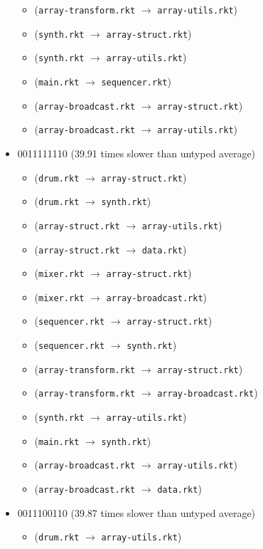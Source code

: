 \documentclass{article}
\newcommand{\mono}[1]{\texttt{#1}}
\begin{document}
\begin{itemize}
\begin{itemize}
  \item (\mono{array-transform.rkt} $\rightarrow$ \mono{array-utils.rkt})
  \item (\mono{synth.rkt} $\rightarrow$ \mono{array-struct.rkt})
  \item (\mono{synth.rkt} $\rightarrow$ \mono{array-utils.rkt})
  \item (\mono{main.rkt} $\rightarrow$ \mono{sequencer.rkt})
  \item (\mono{array-broadcast.rkt} $\rightarrow$ \mono{array-struct.rkt})
  \item (\mono{array-broadcast.rkt} $\rightarrow$ \mono{array-utils.rkt})
  \end{itemize}
\item 0011111110 (39.91 times slower than untyped average)
  \begin{itemize}
  \item (\mono{drum.rkt} $\rightarrow$ \mono{array-struct.rkt})
  \item (\mono{drum.rkt} $\rightarrow$ \mono{synth.rkt})
  \item (\mono{array-struct.rkt} $\rightarrow$ \mono{array-utils.rkt})
  \item (\mono{array-struct.rkt} $\rightarrow$ \mono{data.rkt})
  \item (\mono{mixer.rkt} $\rightarrow$ \mono{array-struct.rkt})
  \item (\mono{mixer.rkt} $\rightarrow$ \mono{array-broadcast.rkt})
  \item (\mono{sequencer.rkt} $\rightarrow$ \mono{array-struct.rkt})
  \item (\mono{sequencer.rkt} $\rightarrow$ \mono{synth.rkt})
  \item (\mono{array-transform.rkt} $\rightarrow$ \mono{array-struct.rkt})
  \item (\mono{array-transform.rkt} $\rightarrow$ \mono{array-broadcast.rkt})
  \item (\mono{synth.rkt} $\rightarrow$ \mono{array-utils.rkt})
  \item (\mono{main.rkt} $\rightarrow$ \mono{synth.rkt})
  \item (\mono{array-broadcast.rkt} $\rightarrow$ \mono{array-utils.rkt})
  \item (\mono{array-broadcast.rkt} $\rightarrow$ \mono{data.rkt})
  \end{itemize}
\item 0011100110 (39.87 times slower than untyped average)
  \begin{itemize}
  \item (\mono{drum.rkt} $\rightarrow$ \mono{array-utils.rkt})

\end{itemize}
\end{itemize}
\end{document}
